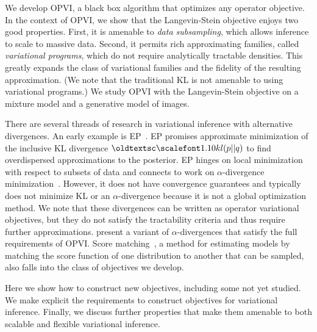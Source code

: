 We develop \gls{OPVI}, a black box algorithm that optimizes any
operator objective.  In the context of \gls{OPVI}, we show that the
Langevin-Stein objective enjoys two good properties.  First, it is
amenable to \textit{data subsampling}, which allows inference to scale to
massive data.  Second, it permits rich approximating families, called
\emph{variational programs}, which do not require analytically tractable
densities. This greatly expands the class of variational families and
the fidelity of the resulting approximation. (We note that the
traditional \gls{KL} is not amenable to using variational programs.)
We study \gls{OPVI} with the Langevin-Stein objective on a
mixture model and a generative model of images.

  There are several threads of research in
variational inference with alternative divergences.  An early example
is \gls{EP}~\citep{minka2001expectation}.  \gls{EP} promises
approximate minimization of the inclusive \gls{KL} divergence
$\textsc{kl}(p || q)$ to find overdispersed approximations to the
posterior.  \gls{EP} hinges on local minimization with respect to
subsets of data and connects to work on $\alpha$-divergence
minimization~\citep{minka2004power, hernandezlobato2015black}.
However, it does not have convergence guarantees and typically does not
minimize \gls{KL} or an $\alpha$-divergence because it is
not a global optimization method. We note that these divergences can be
written as operator variational objectives, but they do not satisfy
the tractability criteria and thus require further approximations.
\citet{li2016r} present a variant of $\alpha$-divergences that satisfy
the full requirements of \gls{OPVI}.
Score matching~\citep{hyvarinen2005estimation}, a method for
estimating models
by matching the score function of one distribution to another that can
be sampled, also falls into the class of objectives we develop.


Here we show how to construct new objectives, including
some not yet studied. We make explicit the requirements to construct
objectives for variational inference. Finally, we discuss further
properties that make them amenable to both scalable and flexible
variational inference.
